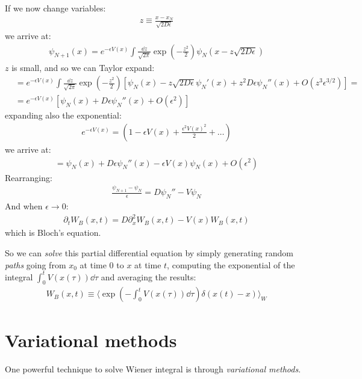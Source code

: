 \documentclass[../template.tex]{subfiles}
\begin{document}
If we now change variables:
\begin{align*}
    z \equiv \frac{x - x_N}{\sqrt{2 D \epsilon}} 
\end{align*}
we arrive at:
\begin{align*}
    \psi_{N+1}(x) = e^{-\epsilon V(x)} \int \frac{\dd{z}}{\sqrt{2 \pi}}\exp\left(-\frac{z^2}{2} \right)  \psi_N(x- z\sqrt{2 D \epsilon})
\end{align*}
$z$ is small, and so we can Taylor expand:
\begin{align*}
    &= e^{-\epsilon V(x)} \int \frac{\dd{z}}{\sqrt{2 \pi}} \exp\left(-\frac{z^2}{2} \right)  \left[\psi_N(x)  - z \sqrt{2 D \epsilon} \psi_N'(x) + z^2 D \epsilon \psi_N'' (x) + O(z^3 \epsilon^{3/2})\right] =\\
    &=e^{-\epsilon V(x)}[\psi_N(x) + D \epsilon \psi_N''(x) + O(\epsilon^2) ]
\end{align*} 
expanding also the exponential:
\begin{align*}
    e^{-\epsilon V(x)} = \left(1- \epsilon V(x) + \frac{\epsilon^2 V(x)^2}{2}  + \dots \right)
\end{align*}
we arrive at:
\begin{align*}
    = \psi_N(x) + D \epsilon \psi_N''(x) - \epsilon V(x) \psi_N(x) + O(\epsilon^2)
\end{align*}
Rearranging:
\begin{align*}
    \frac{\psi_{N+1} - \psi_N}{\epsilon} = D \psi_N'' - V \psi_N 
\end{align*}
And when $\epsilon \to 0$:
\begin{align*}
    \partial_t W_B(x,t) = D \partial_x^2 W_B(x,t) - V(x) W_B(x,t)
\end{align*} 
which is Bloch's equation. 

So we can \textit{solve} this partial differential equation by simply generating random \textit{paths} going from $x_0$ at time $0$ to $x$ at time $t$, computing the exponential of the integral $\int_0^t V(x(\tau)) \dd{\tau}$ and averaging the results:
\begin{align*}
    W_B(x,t) \equiv \langle \exp\left(-\int_0^t V(x(\tau))\dd{\tau}\right) \delta(x(t)-x)\rangle_W
\end{align*}

\section{Variational methods}
One powerful technique to solve Wiener integral is through \textit{variational methods}. 
\end{document}
